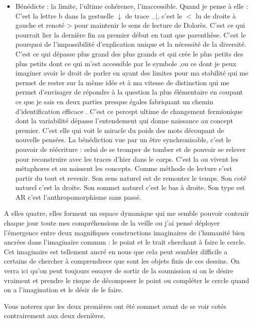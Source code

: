 \documentclass{article}
\begin{document}
\begin{itemize}
\item Bénédicte : la limite, l’ultime cohérence, l’inaccessible. Quand je pense à elle : C'est la lettre b dans la gestuelle $\downarrow $  de trace $_-|$, c'est le $<$ lu de droite à gauche et renoté >  pour maintenir le sens de lecture de Dolorès. C'est ce qui pourrait lier la dernière fin au premier début  en tant que parenthèse.
C'est le pourquoi de l'impossibilité d'explication unique et la nécessité de la diversité. 
 C'est ce qui dépasse plus grand des plus grands  et qui crée le plus petits des plus petits dont ce qui m'est accessible par le symbole ,ou   ce dont je peux imaginer avoir le droit de parler en ayant des limites pour ma stabilité qui me permet de rester sur la même idée et à ma vitesse de distinction qui me permet d'envisager de répondre à la question la plus élémentaire en coupant ce que je sais en deux parties presque égales fabriquant un chemin d'identification efficace . C'est ce percept ultime de changement  fermionique dont la variabilité dépasse l'entendement qui donne naissance au concept premier. 
  C'est elle qui voit le miracle du poids des mots découpant de nouvelle pensées.  La bénédiction vue par un être synchronisable, c'est le pouvoir de réécriture : celui de se tromper de tomber et de pouvoir se relever pour reconstruire avec les traces d'hier dans le corps. C'est la ou vivent les métaphores et ou naissent les concepts. Comme méthode de lecture c'est partir du tout et revenir. Son sens naturel est de remonter le temps. Son coté naturel c'est la droite. Son sommet naturel c'est le bas à droite. Son type est AR c'est l'anthropomorphisme sans passé.

\end{itemize}

A elles quatre, elles forment un espace dynamique qui me semble pouvoir contenir chaque jour toute mes compréhensions  de la veille ou j'ai  pensé  déployer  l'émergence entre deux magnifiques constructions imaginaires de i'humanité bien ancrées  dans l'imaginaire commun :  le point et le trait cherchant à faire le cercle.  Cet imaginaire   est tellement ancré en nous que cela peut sembler difficile a certains de chercher à comprendrece que sont les objets finis de ces dessins.  On verra ici qu'on peut toujours essayer de sortir de la soumission si on le désire vraiment et prendre le risque de  décomposer le point ou compléter le cercle quand on a l'imagination et le désir de le faire.

Vous noterez que les deux premières ont été sommet avant de se voir cotés contrairement aux deux dernières.
\end{document}
